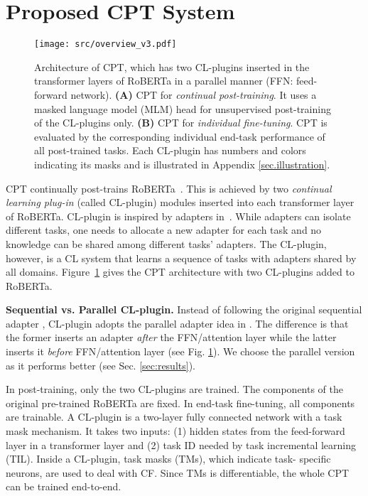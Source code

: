 \documentclass[11pt]{article}
\begin{document}
\section{Proposed CPT System}
\label{sec:cpt}



\begin{figure}[t!]
\centering
\texttt{[image: src/overview\_v3.pdf]}
\vspace{-6mm}
\caption{
Architecture of CPT, which has two CL-plugins inserted in the transformer layers of RoBERTa in a parallel manner (FFN: feed-forward network). \textbf{(A)} CPT for \textit{continual post-training}. It uses a masked language model (MLM) head for unsupervised post-training of the CL-plugins only. \textbf{(B)} CPT for \textit{individual fine-tuning}. CPT is evaluated by the corresponding individual end-task performance of all post-trained tasks. 
Each CL-plugin has numbers and colors indicating its masks and is illustrated in {Appendix} \ref{sec.illustration}.
}
\label{overview}
\end{figure}


CPT continually post-trains RoBERTa~\cite{DBLP:journals/corr/abs-1907-11692}. This is achieved by two \textit{continual learning plug-in} (called CL-plugin) modules inserted into each transformer layer of RoBERTa. CL-plugin is inspired by adapters in~\cite{Houlsby2019Parameter}. While adapters can isolate different tasks, one needs to allocate a new adapter for each task and no knowledge can be shared among different tasks' adapters. The CL-plugin, however, is a CL system that learns a sequence of tasks with adapters shared by all domains. 
Figure~\ref{overview} gives the CPT architecture with two CL-plugins added to RoBERTa. 

{\color{black}\textbf{Sequential vs. Parallel CL-plugin.} Instead of following the original sequential adapter \cite{Houlsby2019Parameter}, CL-plugin adopts the parallel adapter idea in \cite{DBLP:journals/corr/abs-2110-04366}. The difference is that the former inserts an adapter \textit{after} the FFN/attention layer while the latter inserts it \textit{before} FFN/attention layer (see Fig. \ref{overview}). We choose the parallel version as it performs better (see Sec. \ref{sec:results}). 
}

In post-training, only the two CL-plugins are trained. The components of the original pre-trained RoBERTa are fixed. In end-task fine-tuning, all components are trainable. A CL-plugin is a two-layer fully connected network with a task mask mechanism. It takes two inputs: (1) hidden states  from the feed-forward layer in a transformer layer and (2) task ID  needed by task incremental learning (TIL). 
Inside a CL-plugin, task masks (TMs), which indicate task- specific neurons, are used to {deal with CF}. Since TMs is differentiable, the whole CPT can be trained end-to-end. 
\end{document}
